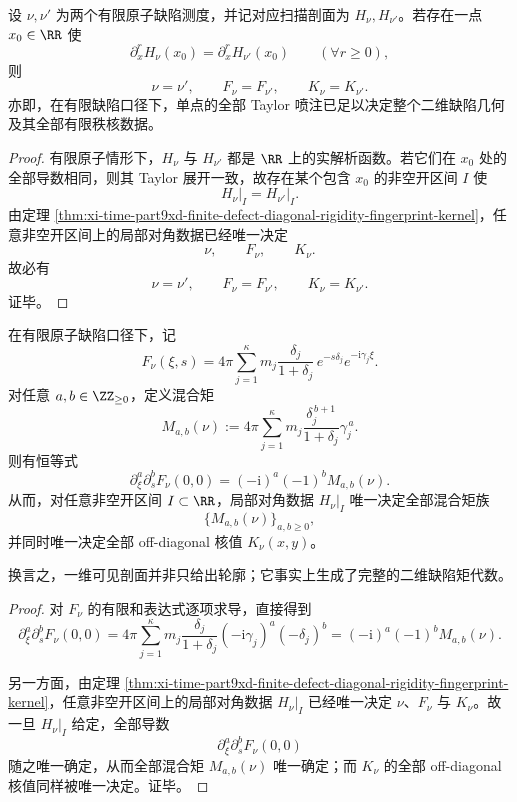 \begin{corollary}[单点无限喷注的全局刚性]\label{cor:conclusion-finite-defect-singlepoint-infinite-jet-rigidity}
设 \(\nu,\nu'\) 为两个有限原子缺陷测度，并记对应扫描剖面为 \(H_\nu,H_{\nu'}\)。若存在一点 \(x_0\in\RR\) 使
\[
\partial_x^r H_\nu(x_0)=\partial_x^r H_{\nu'}(x_0)
\qquad (\forall r\ge 0),
\]
则
\[
\nu=\nu',
\qquad
F_\nu=F_{\nu'},
\qquad
K_\nu=K_{\nu'}.
\]
亦即，在有限缺陷口径下，单点的全部 Taylor 喷注已足以决定整个二维缺陷几何及其全部有限秩核数据。
\end{corollary}
\begin{proof}
有限原子情形下，\(H_\nu\) 与 \(H_{\nu'}\) 都是 \(\RR\) 上的实解析函数。若它们在 \(x_0\) 处的全部导数相同，则其 Taylor 展开一致，故存在某个包含 \(x_0\) 的非空开区间 \(I\) 使
\[
\left.H_\nu\right|_I=\left.H_{\nu'}\right|_I.
\]
由定理 \ref{thm:xi-time-part9xd-finite-defect-diagonal-rigidity-fingerprint-kernel}，任意非空开区间上的局部对角数据已经唯一决定
\[
\nu,\qquad F_\nu,\qquad K_\nu.
\]
故必有
\[
\nu=\nu',
\qquad
F_\nu=F_{\nu'},
\qquad
K_\nu=K_{\nu'}.
\]
证毕。
\end{proof}

\begin{theorem}[局部对角数据生成完整混合矩代数]\label{thm:conclusion-finite-defect-local-diagonal-mixed-moment-algebra}
在有限原子缺陷口径下，记
\[
F_\nu(\xi,s)=
4\pi\sum_{j=1}^{\kappa}
m_j\frac{\delta_j}{1+\delta_j}\,
e^{-s\delta_j}e^{-\mathrm{i}\gamma_j\xi}.
\]
对任意 \(a,b\in\ZZ_{\ge 0}\)，定义混合矩
\[
M_{a,b}(\nu):=
4\pi\sum_{j=1}^{\kappa}
m_j\frac{\delta_j^{\,b+1}}{1+\delta_j}\gamma_j^{\,a}.
\]
则有恒等式
\[
\partial_\xi^a\partial_s^bF_\nu(0,0)
=
(-\mathrm{i})^a(-1)^bM_{a,b}(\nu).
\]
从而，对任意非空开区间 \(I\subset\RR\)，局部对角数据 \(\left.H_\nu\right|_I\) 唯一决定全部混合矩族
\[
\bigl\{M_{a,b}(\nu)\bigr\}_{a,b\ge 0},
\]
并同时唯一决定全部 off-diagonal 核值 \(K_\nu(x,y)\)。

换言之，一维可见剖面并非只给出轮廓；它事实上生成了完整的二维缺陷矩代数。
\end{theorem}
\begin{proof}
对 \(F_\nu\) 的有限和表达式逐项求导，直接得到
\[
\partial_\xi^a\partial_s^bF_\nu(0,0)
=
4\pi\sum_{j=1}^{\kappa}
m_j\frac{\delta_j}{1+\delta_j}
(-\mathrm{i}\gamma_j)^a(-\delta_j)^b
=
(-\mathrm{i})^a(-1)^bM_{a,b}(\nu).
\]

另一方面，由定理 \ref{thm:xi-time-part9xd-finite-defect-diagonal-rigidity-fingerprint-kernel}，任意非空开区间上的局部对角数据 \(\left.H_\nu\right|_I\) 已经唯一决定 \(\nu\)、\(F_\nu\) 与 \(K_\nu\)。故一旦 \(\left.H_\nu\right|_I\) 给定，全部导数
\[
\partial_\xi^a\partial_s^bF_\nu(0,0)
\]
随之唯一确定，从而全部混合矩 \(M_{a,b}(\nu)\) 唯一确定；而 \(K_\nu\) 的全部 off-diagonal 核值同样被唯一决定。证毕。
\end{proof}

